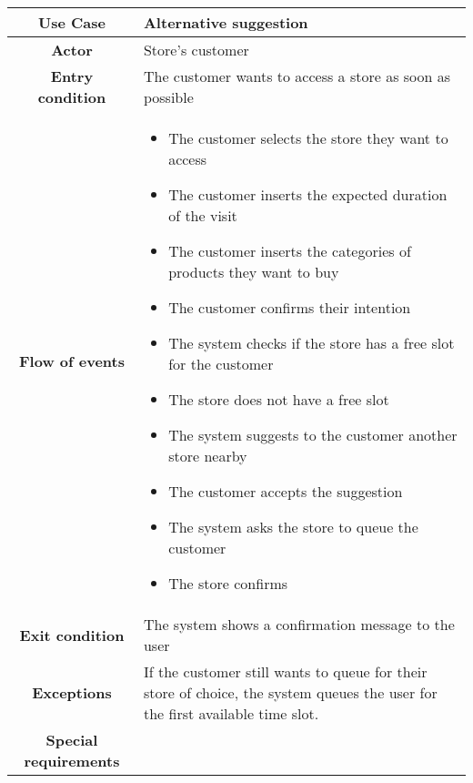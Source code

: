 \documentclass[../../main.tex]{subfiles}
\begin{document}
    \begin{table}[H]
      \centering
        \begin{tabular}{c m{}}
        \hline
        \textbf{Use Case} & Alternative suggestion\\ \hline
        \textbf{Actor} & Store's customer\\ \hline
        \textbf{Entry condition} & The customer wants to access a store as soon as possible\\  \hline
        \textbf{Flow of events} & \begin{itemize}
                                    \item The customer selects the store they want to access
                                    \item The customer inserts the expected duration of the visit
                                    \item The customer inserts the categories of products they want to buy
                                    \item The customer confirms their intention
                                    \item The system checks if the store has a free slot for the customer
                                    \item The store does not have a free slot
                                    \item The system suggests to the customer another store nearby
                                    \item The customer accepts the suggestion
                                    \item The system asks the store to queue the customer
                                    \item The store confirms
                                  \end{itemize}\\ \hline
        \textbf{Exit condition} & The system shows a confirmation message to the user \\ \hline
        \textbf{Exceptions} & If the customer still wants to queue for their store of choice, the system queues the user for the first available time slot. \\ \hline
        \textbf{Special requirements} &\\ \hline
        \end{tabular}
    \end{table}
\end{document}
